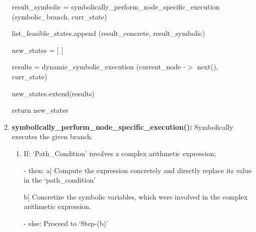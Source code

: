 \documentclass[11pt]{llncs}
\begin{document}
\begin{enumerate}
\begin{algorithm}[H]
{						\vspace{1mm}
		
				                     result\_symbolic = symbolically\_perform\_node\_specific\_execution (symbolic\_branch, curr\_state)
						
						\vspace{1mm}
				                     
				                     list\_feasible\_states.append (result\_concrete, result\_symbolic)
					}
		
					\vspace{3mm}
		
					 {
						\vspace{1mm}
	
					      new\_states = [ ]
	
						\vspace{1mm}
	
					        {
						results = dynamic\_symbolic\_execution (current\_node -$>$ next(), curr\_state)
	
						\vspace{1mm}
		
						new\_states.extend(results)
					      }\;
					
					      return new\_states
					}
					\;
				\end{algorithm}

				\vspace{2mm}

				\item \textbf{symbolically\_perform\_node\_specific\_execution():}  Symbolically executes the given branch.

					\begin{enumerate}
						\item If:  ‘Path\_Condition’ involves a complex arithmetic expression;

						           - then:  a] Compute the expression concretely and directly replace its value in the ‘path\_condition’

						                         \hspace{10mm} b] Concretize the symbolic variables, which were involved in the complex arithmetic expression.

						           - else: Proceed to ‘Step-(b)’


\end{enumerate}
\end{enumerate}
\end{document}
